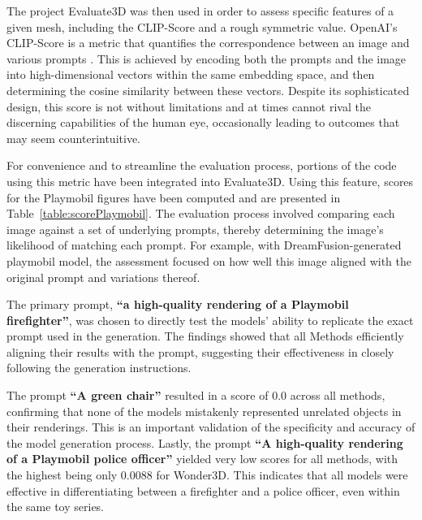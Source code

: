 The project Evaluate3D was then used in order to assess specific features of a given mesh, including the CLIP-Score and a rough symmetric value. 
OpenAI's CLIP-Score is a metric that quantifies the correspondence between an image and various prompts \citep{radfordCLIP}. This is achieved by encoding both the prompts and the image into high-dimensional vectors within the same embedding space, and then determining the cosine similarity between these vectors. Despite its sophisticated design, this score is not without limitations and at times cannot rival the discerning capabilities of the human eye, occasionally leading to outcomes that may seem counterintuitive. 

For convenience and to streamline the evaluation process, portions of the code using this metric have been integrated into Evaluate3D. Using this feature, scores for the Playmobil figures have been computed and are presented in Table~\ref{table:scorePlaymobil}. The evaluation process involved comparing each image against a set of underlying prompts, thereby determining the image's likelihood of matching each prompt. For example, with DreamFusion-generated playmobil model, the assessment focused on how well this image aligned with the original prompt and variations thereof.

The primary prompt, \textbf{``a high-quality rendering of a Playmobil firefighter''}, was chosen to directly test the models' ability to replicate the exact prompt used in the generation. The findings showed that all Methods efficiently aligning their results with the prompt, suggesting their effectiveness in closely following the generation instructions. 

The prompt \textbf{``A green chair''} resulted in a score of 0.0 across all methods, confirming that none of the models mistakenly represented unrelated objects in their renderings. This is an important validation of the specificity and accuracy of the model generation process. Lastly, the prompt \textbf{“A high-quality rendering of a Playmobil police officer”} yielded very low scores for all methods, with the highest being only 0.0088 for Wonder3D. This indicates that all models were effective in differentiating between a firefighter and a police officer, even within the same toy series.

